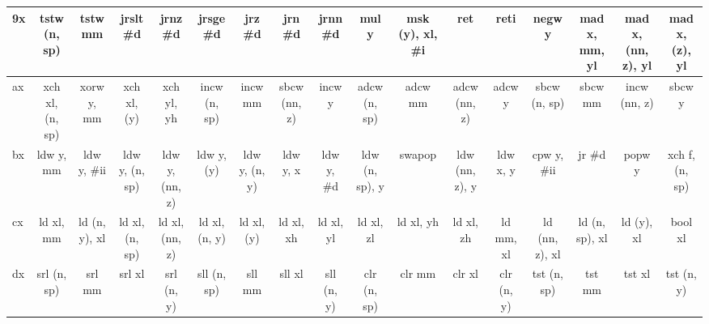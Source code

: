 \documentclass{book}
\begin{document}
\begin{table}
\begin{adjustbox}{width=1.2\textwidth}
\begin{tabular}{l||c|c|c|c|c|c|c|c|c|c|c|c|c|c|c|c}
\hline
9x & \cellcolor{DarkSeaGreen1} tstw (n, sp) & \cellcolor{DarkSeaGreen1} tstw mm & \cellcolor{DarkSeaGreen1} jrslt \#d & \cellcolor{DarkSeaGreen1} jrnz \#d & \cellcolor{DarkSeaGreen1} jrsge \#d & \cellcolor{DarkSeaGreen1} jrz \#d & \cellcolor{DarkSeaGreen1} jrn \#d & \cellcolor{DarkSeaGreen1} jrnn \#d & \cellcolor{Bisque1} mul y & \cellcolor{DarkSeaGreen1} msk (y), xl, \#i & \cellcolor{DarkSeaGreen1} ret & \cellcolor{DarkSeaGreen1} reti & \cellcolor{Bisque1} negw y & \cellcolor{Bisque1} mad x, mm, yl & \cellcolor{Bisque1} mad x, (nn, z), yl & \cellcolor{Bisque1} mad x, (z), yl \\
\hline
ax & \cellcolor{Bisque1} xch xl, (n, sp) & \cellcolor{Bisque1} xorw y, mm & \cellcolor{DarkSeaGreen1} xch xl, (y) & \cellcolor{Bisque1} xch yl, yh & \cellcolor{DarkSeaGreen1} incw (n, sp) & \cellcolor{DarkSeaGreen1} incw mm & \cellcolor{Bisque1} sbcw (nn, z) & \cellcolor{DarkSeaGreen1} incw y & \cellcolor{Bisque1} adcw (n, sp) & \cellcolor{Bisque1} adcw mm & \cellcolor{Bisque1} adcw (nn, z) & \cellcolor{Bisque1} adcw y & \cellcolor{Bisque1} sbcw (n, sp) & \cellcolor{Bisque1} sbcw mm & \cellcolor{DarkSeaGreen1} incw (nn, z) & \cellcolor{Bisque1} sbcw y \\
\hline
bx & \cellcolor{DarkSeaGreen1} ldw y, mm & \cellcolor{DarkSeaGreen1} ldw y, \#ii & \cellcolor{DarkSeaGreen1} ldw y, (n, sp) & \cellcolor{DarkSeaGreen1} ldw y, (nn, z) & \cellcolor{DarkSeaGreen1} ldw y, (y) & \cellcolor{Bisque1} ldw y, (n, y) & \cellcolor{DarkSeaGreen1} ldw y, x & \cellcolor{DarkSeaGreen1} ldw y, \#d & \cellcolor{DarkSeaGreen1} ldw (n, sp), y & \cellcolor{DarkSeaGreen1} swapop & \cellcolor{DarkSeaGreen1} ldw (nn, z), y & \cellcolor{DarkSeaGreen1} ldw x, y & \cellcolor{Bisque1} cpw y, \#ii & \cellcolor{DarkSeaGreen1} jr \#d & \cellcolor{DarkSeaGreen1} popw y & \cellcolor{DarkSeaGreen1} xch f, (n, sp) \\
\hline
cx & \cellcolor{DarkSeaGreen1} ld xl, mm & \cellcolor{Bisque1} ld (n, y), xl & \cellcolor{DarkSeaGreen1} ld xl, (n, sp) & \cellcolor{DarkSeaGreen1} ld xl, (nn, z) & \cellcolor{Bisque1} ld xl, (n, y) & \cellcolor{DarkSeaGreen1} ld xl, (y) & \cellcolor{DarkSeaGreen1} ld xl, xh & \cellcolor{DarkSeaGreen1} ld xl, yl & \cellcolor{DarkSeaGreen1} ld xl, zl & \cellcolor{DarkSeaGreen1} ld xl, yh & \cellcolor{DarkSeaGreen1} ld xl, zh & \cellcolor{DarkSeaGreen1} ld mm, xl & \cellcolor{DarkSeaGreen1} ld (nn, z), xl & \cellcolor{DarkSeaGreen1} ld (n, sp), xl & \cellcolor{DarkSeaGreen1} ld (y), xl & \cellcolor{DarkSeaGreen1} bool xl \\
\hline
dx & \cellcolor{DarkSeaGreen1} srl (n, sp) & \cellcolor{DarkSeaGreen1} srl mm & \cellcolor{DarkSeaGreen1} srl xl & \cellcolor{Bisque1} srl (n, y) & \cellcolor{DarkSeaGreen1} sll (n, sp) & \cellcolor{DarkSeaGreen1} sll mm & \cellcolor{DarkSeaGreen1} sll xl & \cellcolor{Bisque1} sll (n, y) & \cellcolor{DarkSeaGreen1} clr (n, sp) & \cellcolor{DarkSeaGreen1} clr mm & \cellcolor{DarkSeaGreen1} clr xl & \cellcolor{Bisque1} clr (n, y) & \cellcolor{DarkSeaGreen1} tst (n, sp) & \cellcolor{DarkSeaGreen1} tst mm & \cellcolor{DarkSeaGreen1} tst xl & \cellcolor{Bisque1} tst (n, y) \\

\end{tabular}
\end{adjustbox}
\end{table}
\end{document}
